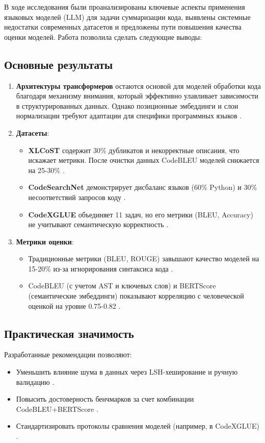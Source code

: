 \documentclass[14pt]{article}
\theoremstyle{definition}
\begin{document}
В ходе исследования были проанализированы ключевые аспекты применения языковых моделей (LLM) для задачи суммаризации кода, выявлены системные недостатки современных датасетов и предложены пути повышения качества оценки моделей. Работа позволила сделать следующие выводы:

\subsection{Основные результаты}
\begin{enumerate}
    \item \textbf{Архитектуры трансформеров} остаются основой для моделей обработки кода благодаря механизму внимания, который эффективно улавливает зависимости в структурированных данных. Однако позиционные эмбеддинги и слои нормализации требуют адаптации для специфики программных языков \cite{guo2021graphcodebert}.
    
    \item \textbf{Датасеты}:
    \begin{itemize}
        \item \textbf{XLCoST} содержит 30\% дубликатов и некорректные описания, что искажает метрики. После очистки данных CodeBLEU моделей снижается на 25-30\% \cite{zhu2022, chen2023}.
        \item \textbf{CodeSearchNet} демонстрирует дисбаланс языков (60\% Python) и 30\% несоответствий запросов коду \cite{husain2019codesearchnet, allamanis2019adverse}.
        \item \textbf{CodeXGLUE} объединяет 11 задач, но его метрики (BLEU, Accuracy) не учитывают семантическую корректность \cite{lu2021codexglue, ren2021}.
    \end{itemize}
    \item \textbf{Метрики оценки}:
    \begin{itemize}
        \item Традиционные метрики (BLEU, ROUGE) завышают качество моделей на 15-20\% из-за игнорирования синтаксиса кода \cite{chen2023, feng2023}.
        \item CodeBLEU (с учетом AST и ключевых слов) и BERTScore (семантические эмбеддинги) показывают корреляцию с человеческой оценкой на уровне 0.75-0.82 \cite{ren2021, zhang2020}.
    \end{itemize}
\end{enumerate}

\subsection{Практическая значимость}
Разработанные рекомендации позволяют:
\begin{itemize}
    \item Уменьшить влияние шума в данных через LSH-хеширование и ручную валидацию \cite{lsh, chen2023}.
    \item Повысить достоверность бенчмарков за счет комбинации CodeBLEU+BERTScore \cite{wan2023codet5+, zhang2020}.
    \item Стандартизировать протоколы сравнения моделей (например, в CodeXGLUE) \cite{codexglue_repo, lu2021codexglue}.
\end{itemize}
\end{document}
